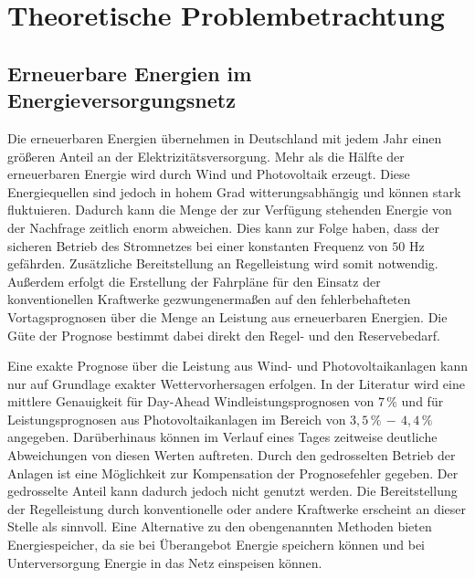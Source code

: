 \chapter{Theoretische Problembetrachtung}
\label{chap:theorie}
\minitoc


\section{Erneuerbare Energien im Energieversorgungsnetz}

Die erneuerbaren Energien \"ubernehmen in Deutschland mit jedem Jahr einen
gr\"o\ss eren Anteil an der Elektrizit\"atsversorgung. Mehr als die H\"alfte
\cite{BMU} der erneuerbaren Energie wird durch Wind und Photovoltaik erzeugt.
Diese Energiequellen sind jedoch in hohem Grad witterungsabh\"angig und k\"onnen
stark fluktuieren. Dadurch kann die Menge der zur Verf\"ugung stehenden Energie
von der Nachfrage zeitlich enorm abweichen.  Dies kann zur Folge haben, dass der
sicheren Betrieb des Stromnetzes bei einer konstanten Frequenz von $50$ Hz
gef\"ahrden. Zus\"atzliche Bereitstellung an Regelleistung wird somit
notwendig. Au\ss erdem erfolgt die Erstellung der Fahrpl\"ane f\"ur den Einsatz
der konventionellen Kraftwerke gezwungenerma\ss en auf den fehlerbehafteten
Vortagsprognosen \"uber die Menge an Leistung aus erneuerbaren Energien. Die
G\"ute der Prognose bestimmt dabei direkt den Regel- und den Reservebedarf.

Eine exakte Prognose \"uber die Leistung aus Wind- und Photovoltaikanlagen kann
nur auf Grundlage exakter Wettervorhersagen erfolgen. In der Literatur wird eine
mittlere Genauigkeit f\"ur Day-Ahead Windleistungsprognosen von $7\,\%$
\cite{prognose_doctor} und f\"ur Leistungsprognosen aus Photovoltaikanlagen im
Bereich von $3,5\,\%\,-\,4,4\,\%$ \cite{solarvorhersagung} angegeben.
Dar\"uberhinaus k\"onnen im Verlauf eines Tages zeitweise deutliche Abweichungen
von diesen Werten auftreten. Durch den gedrosselten Betrieb der Anlagen ist
eine M\"oglichkeit zur Kompensation der Prognosefehler gegeben. Der gedrosselte
Anteil kann dadurch jedoch nicht genutzt werden. Die Bereitstellung der
Regelleistung durch konventionelle oder andere Kraftwerke erscheint an dieser
Stelle als sinnvoll. Eine Alternative zu den obengenannten Methoden bieten
Energiespeicher, da sie bei \"Uberangebot Energie speichern k\"onnen und bei
Unterversorgung Energie in das Netz einspeisen k\"onnen.

